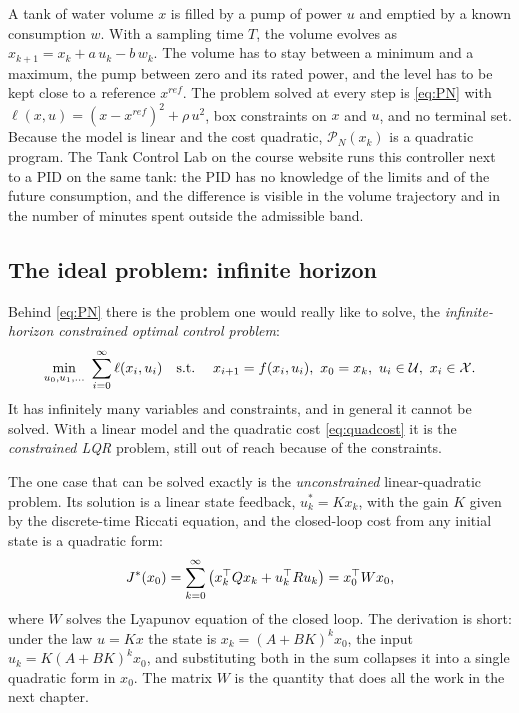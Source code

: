 \begin{example}
A tank of water volume $x$ is filled by a pump of power $u$ and emptied by a known consumption
$w$. With a sampling time $T$, the volume evolves as $x_{k+1} = x_k + a\,u_k - b\,w_k$. The
volume has to stay between a minimum and a maximum, the pump between zero and its rated power,
and the level has to be kept close to a reference $x^{ref}$. The problem solved at every step is
\eqref{eq:PN} with $\ell(x,u) = (x - x^{ref})^2 + \rho\,u^2$, box constraints on $x$ and $u$, and
no terminal set. Because the model is linear and the cost quadratic, $\mathcal{P}_N(x_k)$ is a
quadratic program. The Tank Control Lab on the course website runs this controller next to a
PID on the same tank: the PID has no knowledge of the limits and of the future consumption,
and the difference is visible in the volume trajectory and in the number of minutes spent
outside the admissible band.
\end{example}

\subsection{The ideal problem: infinite horizon}

Behind \eqref{eq:PN} there is the problem one would really like to solve, the
\emph{infinite-horizon constrained optimal control problem}:
\begin{equation}
  \min_{u_0,u_1,\dots}\ \sum_{i=0}^{\infty} \ell(x_i, u_i)
  \quad \st\quad x_{i+1} = f(x_i,u_i),\ x_0 = x_k,\ u_i \in \U,\ x_i \in \X .
  \label{eq:infhor}
\end{equation}
It has infinitely many variables and constraints, and in general it cannot be solved. With a
linear model and the quadratic cost \eqref{eq:quadcost} it is the \emph{constrained LQR}
problem, still out of reach because of the constraints.

The one case that can be solved exactly is the \emph{unconstrained} linear-quadratic problem.
Its solution is a linear state feedback, $u^*_k = K x_k$, with the gain $K$ given by the
discrete-time Riccati equation, and the closed-loop cost from any initial state is a quadratic
form:
\begin{equation}
  J^*(x_0) = \sum_{k=0}^{\infty}\big(x_k^{\top} Q x_k + u_k^{\top} R u_k\big) = x_0^{\top} W x_0 ,
  \label{eq:Wcost}
\end{equation}
where $W$ solves the Lyapunov equation of the closed loop. The derivation is short: under the
law $u = Kx$ the state is $x_k = (A+BK)^k x_0$, the input $u_k = K(A+BK)^k x_0$, and
substituting both in the sum collapses it into a single quadratic form in $x_0$. The matrix $W$
is the quantity that does all the work in the next chapter.

